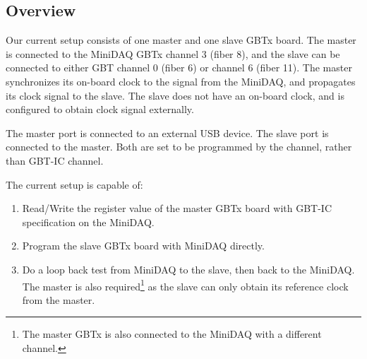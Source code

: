 \subsection{Overview}
Our current setup consists of one master and one slave GBTx board.
The master is connected to the MiniDAQ GBTx channel 3 (fiber 8),
and the slave can be connected to either GBT channel 0 (fiber 6) or channel 6
(fiber 11).
The master synchronizes its on-board clock to the signal from the MiniDAQ,
and propagates its clock signal to the slave.
The slave does not have an on-board clock,
and is configured to obtain clock signal externally.

The master \itwoc port is connected to an external USB device.
The slave \itwoc port is connected to the master.
Both are set to be programmed by the \itwoc channel,
rather than GBT-IC channel.

The current setup is capable of:
\begin{enumerate}
    \item Read/Write the register value of the master GBTx board with GBT-IC
        specification on the MiniDAQ.
    \item Program the slave GBTx board with MiniDAQ directly.
    \item Do a loop back test from MiniDAQ to the slave, then back to the
        MiniDAQ.
        The master is also required\footnote{
            The master GBTx is also connected to the MiniDAQ with a different
        channel.}
        as the slave can only obtain its reference clock from the master.
\end{enumerate}
